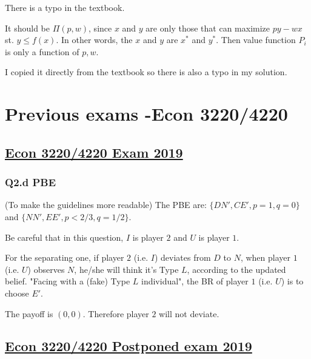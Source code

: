 \documentclass{article}
\begin{document}
There is a typo in the textbook.

It should be $\Pi(p,w)$, since $x$ and $y$ are only those that can maximize $py -wx$ st. $y \le f(x)$. In other words, the $x$ and $y$ are $x^*$ and $y^*$. Then value function $P_i$ is only a function of $p,w$. 

\medskip

I copied it directly from the textbook so there is also a typo in my solution.

\section{Previous exams -Econ 3220/4220}

\subsection{\href{https://www.uio.no/studier/emner/sv/oekonomi/ECON4220/previous-exams/econ32_4220_2019h_sensorveiledning.pdf}{Econ 3220/4220 Exam 2019}}


\subsubsection{Q2.d PBE}

(To make the guidelines more readable) The PBE are:
$\{DN', CE', p=1,q=0\}$ and $\{NN', EE', p<2/3, q=1/2\}$. 

\smallskip

Be careful that in this question, $I$ is player $2$ and $U$ is player $1$.

\smallskip

For the separating one, if player $2$ (i.e. $I$) deviates from $D$ to $N$, when player $1$ (i.e. $U$) observes $N$, he/she will think it's Type $L$, according to the updated belief. 
"Facing with a (fake) Type $L$ individual", the BR of player $1$ (i.e. $U$)  is to choose $E'$. 

\smallskip

The payoff is $(0,0)$. Therefore player $2$ will not deviate.




\subsection{\href{https://www.uio.no/studier/emner/sv/oekonomi/ECON4220/previous-exams/econ32_4220_2019h_postponed_guidelines.pdf}{Econ 3220/4220 Postponed exam 2019}}
\end{document}
